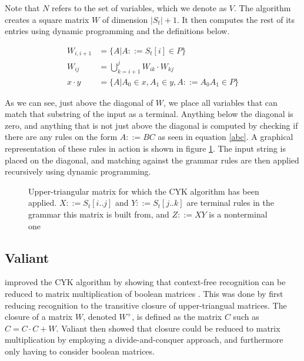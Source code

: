 \documentclass[a4paper,12pt,twosided]{report}
\renewcommand\cite{\citep}
\newcommand{\subt}[3] { 
  \draw[grid] (#1,#1) -- (#1,#2) node[inChart] {#3} -- (#2,#2);
  \fill[color=black] (#1,#2) circle (2pt)
 }
\newcommand{\mrk}[2]{\node[inChart] at (#1,#1) {#2}}
\begin{document}
Note that $N$ refers to the set of variables, which we denote as $V$. The
algorithm creates a square matrix $W$ of dimension $|S_t|+1$.  It then computes
the rest of its entries using dynamic programming and the definitions below.

\begin{align}
W_{i,i+1} &= \{ A | A ::= S_t[i] \in P \} \\
W_{ij}    &= \bigcup_{k=i+1}^{j} W_{ik} \cdot W_{kj} \\
x \cdot y &= \{ A | A_0 \in x, A_1 \in y, A ::= A_0A_1 \in P \} \label{abc}
\end{align}

As we can see, just above the diagonal of $W$, we place all variables that can
match that substring of the input as a terminal. Anything below the diagonal is
zero, and anything that is not just above the diagonal is computed by checking
if there are any rules on the form $A ::= BC$ as seen in equation \ref{abc}. A
graphical representation of these rules in action is shown in figure
\ref{exchart}. The input string is placed on the diagonal, and matching against
the grammar rules are then applied recursively using dynamic programming. 

\begin{figure}[H]
  \centering
  \caption{\label{exchart}Upper-triangular matrix for which the CYK algorithm
           has been applied. $X ::= S_t[i..j]$ and $Y ::= S_t[j..k]$ are
           terminal rules in the grammar this matrix is built from, and $Z
           ::= XY$ is a nonterminal one} 
\end{figure}

\subsection{Valiant}
\citet{Valiant75} improved the CYK algorithm by showing that
context-free recognition can be reduced to matrix multiplication of boolean
matrices \cite{Valiant75}. This was done by first reducing recognition to the
transitive closure of upper-triangual matrices.  The closure of a matrix $W$,
denoted $W^+$, is defined as the matrix $C$ such as $C = C \cdot C + W$.
Valiant then showed that closure could be reduced to matrix multiplication by
employing a divide-and-conquer approach, and furthermore only having to consider
boolean matrices. 
\end{document}
